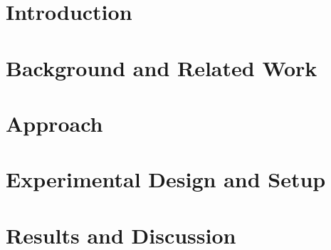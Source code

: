 \documentclass
[
    twoside,                 %
    openany,                 %
    cleardoublepage = empty, %
    fontsize = 12 pt,        %
    american,                %
    captions = tableheading, %
    numbers = noenddot,      %
    footheight = 35 pt,      %
]
{scrbook}
\begin{document}
    \frontmatter
    

    \pagestyle{plain}

    

    

    

    \tableofcontents

    \pagestyle{headings}
    \mainmatter

    \chapter{Introduction}\label{chap:introduction}
    


    
    \chapter{Background and Related Work}\label{chap:background}
    

    \chapter{Approach}\label{chap:approach}
    

    \chapter{Experimental Design and Setup}\label{chap:edas}
    

    \chapter{Results and Discussion}\label{chap:results}
    



    \makeatletter
        \def\toclevel@chapter{-1}
        \def\toclevel@section{0}
    \makeatother
\end{document}

